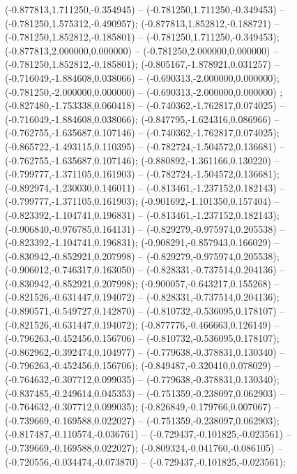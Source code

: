  (-0.877813,1.711250,-0.354945) -- (-0.781250,1.711250,-0.349453) -- (-0.781250,1.575312,-0.490957);
 (-0.877813,1.852812,-0.188721) -- (-0.781250,1.852812,-0.185801) -- (-0.781250,1.711250,-0.349453);
 (-0.877813,2.000000,0.000000) -- (-0.781250,2.000000,0.000000) -- (-0.781250,1.852812,-0.185801);
 (-0.805167,-1.878921,0.031257) -- (-0.716049,-1.884608,0.038066) -- (-0.690313,-2.000000,0.000000);
 (-0.781250,-2.000000,0.000000) -- (-0.690313,-2.000000,0.000000) ;
 (-0.827480,-1.753338,0.060418) -- (-0.740362,-1.762817,0.074025) -- (-0.716049,-1.884608,0.038066);
 (-0.847795,-1.624316,0.086966) -- (-0.762755,-1.635687,0.107146) -- (-0.740362,-1.762817,0.074025);
 (-0.865722,-1.493115,0.110395) -- (-0.782724,-1.504572,0.136681) -- (-0.762755,-1.635687,0.107146);
 (-0.880892,-1.361166,0.130220) -- (-0.799777,-1.371105,0.161903) -- (-0.782724,-1.504572,0.136681);
 (-0.892974,-1.230030,0.146011) -- (-0.813461,-1.237152,0.182143) -- (-0.799777,-1.371105,0.161903);
 (-0.901692,-1.101350,0.157404) -- (-0.823392,-1.104741,0.196831) -- (-0.813461,-1.237152,0.182143);
 (-0.906840,-0.976785,0.164131) -- (-0.829279,-0.975974,0.205538) -- (-0.823392,-1.104741,0.196831);
 (-0.908291,-0.857943,0.166029) -- (-0.830942,-0.852921,0.207998) -- (-0.829279,-0.975974,0.205538);
 (-0.906012,-0.746317,0.163050) -- (-0.828331,-0.737514,0.204136) -- (-0.830942,-0.852921,0.207998);
 (-0.900057,-0.643217,0.155268) -- (-0.821526,-0.631447,0.194072) -- (-0.828331,-0.737514,0.204136);
 (-0.890571,-0.549727,0.142870) -- (-0.810732,-0.536095,0.178107) -- (-0.821526,-0.631447,0.194072);
 (-0.877776,-0.466663,0.126149) -- (-0.796263,-0.452456,0.156706) -- (-0.810732,-0.536095,0.178107);
 (-0.862962,-0.392474,0.104977) -- (-0.779638,-0.378831,0.130340) -- (-0.796263,-0.452456,0.156706);
 (-0.849487,-0.320410,0.078029) -- (-0.764632,-0.307712,0.099035) -- (-0.779638,-0.378831,0.130340);
 (-0.837485,-0.249614,0.045353) -- (-0.751359,-0.238097,0.062903) -- (-0.764632,-0.307712,0.099035);
 (-0.826849,-0.179766,0.007067) -- (-0.739669,-0.169588,0.022027) -- (-0.751359,-0.238097,0.062903);
 (-0.817487,-0.110574,-0.036761) -- (-0.729437,-0.101825,-0.023561) -- (-0.739669,-0.169588,0.022027);
 (-0.809324,-0.041760,-0.086105) -- (-0.720556,-0.034474,-0.073870) -- (-0.729437,-0.101825,-0.023561);
